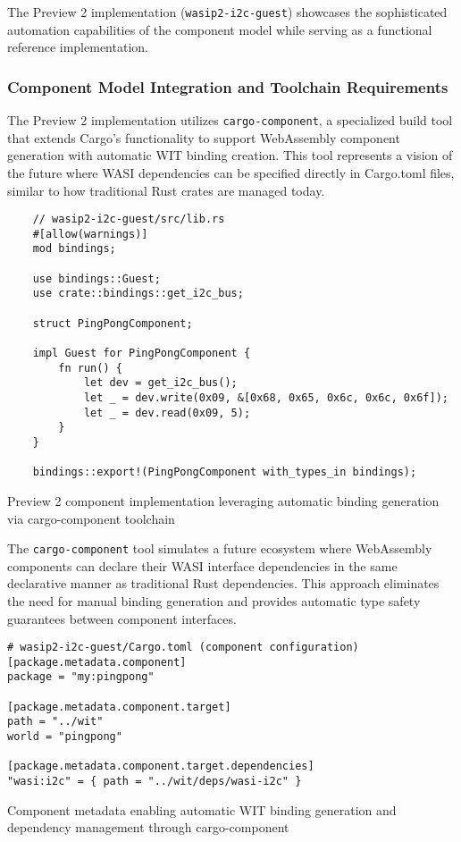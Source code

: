 The Preview 2 implementation (\texttt{wasip2-i2c-guest}) showcases the sophisticated automation capabilities of the component model while serving as a functional reference implementation.

\subsubsection{Component Model Integration and Toolchain Requirements}

The Preview 2 implementation utilizes \texttt{cargo-component}, a specialized build tool that extends Cargo's functionality to support WebAssembly component generation with automatic WIT binding creation. This tool represents a vision of the future where WASI dependencies can be specified directly in Cargo.toml files, similar to how traditional Rust crates are managed today.

\begin{listing}[H]
    \begin{verbatim}
    // wasip2-i2c-guest/src/lib.rs
    #[allow(warnings)]
    mod bindings;
    
    use bindings::Guest;
    use crate::bindings::get_i2c_bus;
    
    struct PingPongComponent;
    
    impl Guest for PingPongComponent {
        fn run() {
            let dev = get_i2c_bus();
            let _ = dev.write(0x09, &[0x68, 0x65, 0x6c, 0x6c, 0x6f]);
            let _ = dev.read(0x09, 5);
        }
    }
    
    bindings::export!(PingPongComponent with_types_in bindings);
    \end{verbatim}
    \caption{Preview 2 component implementation leveraging automatic binding generation via cargo-component toolchain}
    \label{lst:preview2-guest}
\end{listing}

The \texttt{cargo-component} tool simulates a future ecosystem where WebAssembly components can declare their WASI interface dependencies in the same declarative manner as traditional Rust dependencies. This approach eliminates the need for manual binding generation and provides automatic type safety guarantees between component interfaces.

\begin{listing}[H]
\begin{verbatim}
# wasip2-i2c-guest/Cargo.toml (component configuration)
[package.metadata.component]
package = "my:pingpong"

[package.metadata.component.target]
path = "../wit"
world = "pingpong"

[package.metadata.component.target.dependencies]
"wasi:i2c" = { path = "../wit/deps/wasi-i2c" }
\end{verbatim}
\caption{Component metadata enabling automatic WIT binding generation and dependency management through cargo-component}
\label{lst:component-config}
\end{listing}

